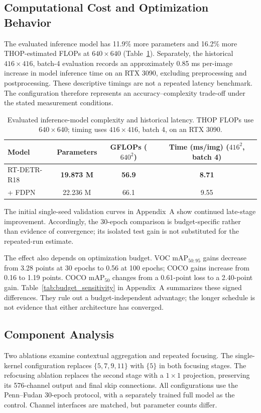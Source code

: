 \documentclass[journal]{IEEEtran}
\newcommand{\mapfifty}{mAP$_{50}$}
\newcommand{\mapcoco}{mAP$_{50:95}$}
\begin{document}
\subsection{Computational Cost and Optimization Behavior}
The evaluated inference model has 11.9\% more parameters and 16.2\% more THOP-estimated FLOPs at $640\times640$ (Table~\ref{tab:complexity}). Separately, the historical $416\times416$, batch-4 evaluation records an approximately 0.85 ms per-image increase in model inference time on an RTX 3090, excluding preprocessing and postprocessing. These descriptive timings are not a repeated latency benchmark. The configuration therefore represents an accuracy--complexity trade-off under the stated measurement conditions.

\begin{table}[t]
\centering
\caption{Evaluated inference-model complexity and historical latency. THOP FLOPs use $640\times640$; timing uses $416\times416$, batch 4, on an RTX 3090.}
\label{tab:complexity}
\setlength{\tabcolsep}{3.5pt}
\begin{tabular}{lccc}
\toprule
Model & Parameters & \shortstack{GFLOPs\\($640^2$)} & \shortstack{Time (ms/img)\\($416^2$, batch 4)}\\
\midrule
RT-DETR-R18 & \textbf{19.873 M} & \textbf{56.9} & \textbf{8.71}\\
+ FDPN & 22.236 M & 66.1 & 9.55\\
\bottomrule
\end{tabular}
\end{table}

The initial single-seed validation curves in Appendix~A show continued late-stage improvement. Accordingly, the 30-epoch comparison is budget-specific rather than evidence of convergence; its isolated test gain is not substituted for the repeated-run estimate.

The effect also depends on optimization budget. VOC \mapcoco{} gains decrease from 3.28 points at 30 epochs to 0.56 at 100 epochs; COCO gains increase from 0.16 to 1.19 points. COCO \mapfifty{} changes from a 0.61-point loss to a 2.40-point gain. Table~\ref{tab:budget_sensitivity} in Appendix~A summarizes these signed differences. They rule out a budget-independent advantage; the longer schedule is not evidence that either architecture has converged.

\subsection{Component Analysis}
Two ablations examine contextual aggregation and repeated focusing. The single-kernel configuration replaces $\{5,7,9,11\}$ with $\{5\}$ in both focusing stages. The refocusing ablation replaces the second stage with a $1\times1$ projection, preserving its 576-channel output and final skip connections. All configurations use the Penn--Fudan 30-epoch protocol, with a separately trained full model as the control. Channel interfaces are matched, but parameter counts differ.
\end{document}
